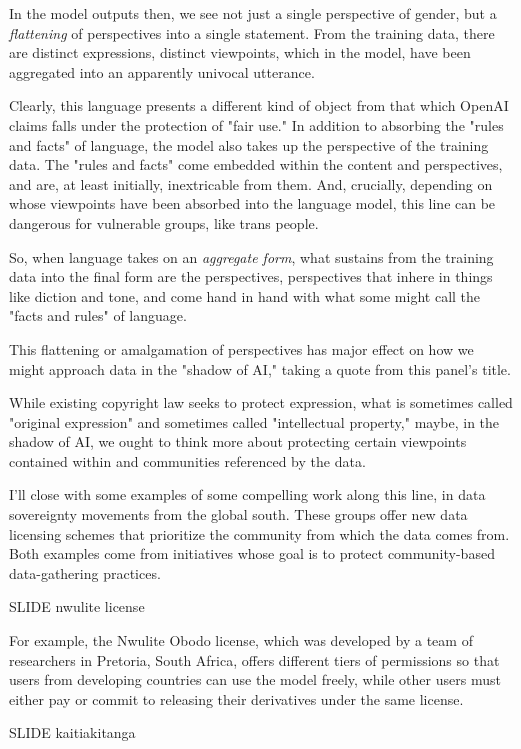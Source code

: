 \documentclass[11pt]{article}
\begin{document}
In the model outputs then, we see not just a single perspective of
gender, but a \emph{flattening} of perspectives into a single statement.
From the training data, there are distinct expressions, distinct
viewpoints, which in the model, have been aggregated into an
apparently univocal utterance.

Clearly, this language presents a different kind of object from that
which OpenAI claims falls under the protection of "fair use." In
addition to absorbing the "rules and facts" of language, the model
also takes up the perspective of the training data. The "rules and
facts" come embedded within the content and perspectives, and are, at
least initially, inextricable from them. And, crucially, depending on
whose viewpoints have been absorbed into the language model, this line
can be dangerous for vulnerable groups, like trans people.

So, when language takes on an \emph{aggregate form}, what sustains from the
training data into the final form are the perspectives, perspectives
that inhere in things like diction and tone, and come hand in hand
with what some might call the "facts and rules" of language.

This flattening or amalgamation of perspectives has major effect on
how we might approach data in the "shadow of AI," taking a quote from
this panel's title.

While existing copyright law seeks to protect expression, what is
sometimes called "original expression" and sometimes called
"intellectual property," maybe, in the shadow of AI, we ought to think
more about protecting certain viewpoints contained within and
communities referenced by the data.

I'll close with some examples of some compelling work along this line,
in data sovereignty movements from the global south. These groups
offer new data licensing schemes that prioritize the community from
which the data comes from. Both examples come from initiatives whose
goal is to protect community-based data-gathering practices.

SLIDE nwulite license

For example, the Nwulite Obodo license, which was developed by a team
of researchers in Pretoria, South Africa, offers different tiers of
permissions so that users from developing countries can use the model
freely, while other users must either pay or commit to releasing their
derivatives under the same license.

SLIDE kaitiakitanga
\end{document}
